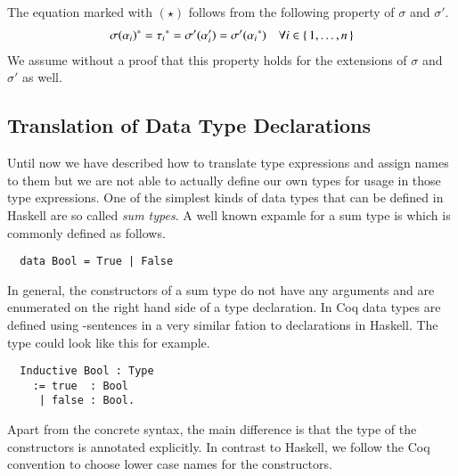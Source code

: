 The equation marked with $(\star)$ follows from the following property of $\sigma$ and $\sigma'$.
\begin{align*}
  {\sigma(\alpha_i)}^{*} = {\tau_i}^{*}
                            = \sigma'(\alpha_i')
                            = \sigma'({\alpha_i}^{*})
  &&\forall i \in \{\, 1, \ldots, n \,\}
\end{align*}
We assume without a proof that this property holds for the extensions of $\sigma$ and $\sigma'$ as well.

\subsection{Translation of Data Type Declarations}
Until now we have described how to translate type expressions and assign names to them but we are not able to actually define our own types for usage in those type expressions.
One of the simplest kinds of data types that can be defined in Haskell are so called \textit{sum types}.
A well known expamle for a sum type is  which is commonly defined as follows.
\begin{verbatim}
  data Bool = True | False
\end{verbatim}
In general, the constructors of a sum type do not have any arguments and are enumerated on the right hand side of a  type declaration.
In Coq data types are defined using -sentences in a very similar fation to  declarations in Haskell.
The  type could look like this for example.
\begin{verbatim}
  Inductive Bool : Type
    := true  : Bool
     | false : Bool.
\end{verbatim}
Apart from the concrete syntax, the main difference is that the type of the constructors is annotated explicitly.
In contrast to Haskell, we follow the Coq convention to choose lower case names for the constructors.


